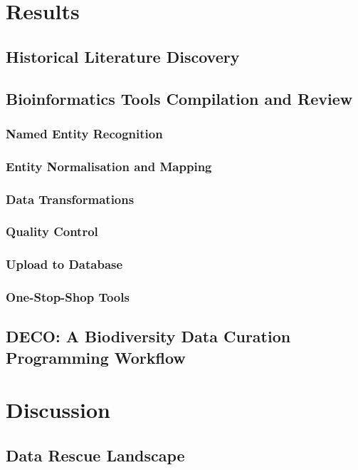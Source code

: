 \section{Results}
\label{sec:deco-results}

   \subsection{Historical Literature Discovery}
   \subsection{Bioinformatics Tools Compilation and Review}

   \subsubsection{Named Entity Recognition}
   \subsubsection{Entity Normalisation and Mapping}
   \subsubsection{Data Transformations}
   \subsubsection{Quality Control}
   \subsubsection{Upload to Database}
   \subsubsection{One-Stop-Shop Tools}
   \subsection{DECO: A Biodiversity Data Curation Programming Workflow}

\section{Discussion}
\label{sec:deco-discussion}

   \subsection{Data Rescue Landscape}
